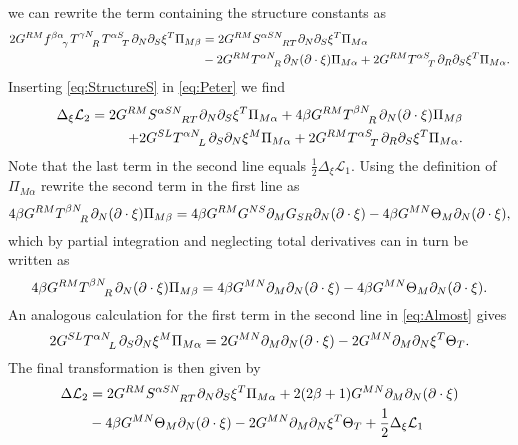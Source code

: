 we can rewrite the term containing the structure constants as 
\begin{equation}\label{eq:StructureS}
    \begin{aligned}
        2G^{RM}\tensor{f}{^{\beta\alpha}_\gamma}\tensor{T}{^{\gamma N}_R}\tensor{T}{^{\alpha S}_T}\pd_N\pd_S\xi^T\Pi_{M\beta} &= 2G^{RM}\tensor{S}{^{\alpha SN}_{RT}}\pd_N\pd_S\xi^T\Pi_{M\alpha}\\
        &-2G^{RM}\tensor{T}{^{\alpha N}_R}\pd_N(\pd\cdot\xi)\Pi_{M\alpha}+2G^{RM}\tensor{T}{^{\alpha S}_T}\pd_R\pd_S\xi^T\Pi_{M\alpha}.
    \end{aligned}
\end{equation}
Inserting \eqref{eq:StructureS} in \eqref{eq:Peter} we find 
\begin{equation}\label{eq:Almost}
    \begin{aligned}
    \Delta_\xi \mathcal{L}_2 = 2G^{RM}\tensor{S}{^{\alpha SN}_{RT}}\pd_N\pd_S\xi^T\Pi_{M\alpha}+4\beta G^{RM}\tensor{T}{^{\beta N}_R}\pd_N(\pd\cdot\xi)\Pi_{M\beta}\\
    +2G^{SL}\tensor{T}{^{\alpha N}_L}\pd_S\pd_N\xi^M\Pi_{M\alpha}+2G^{RM}\tensor{T}{^{\alpha S}_T}\pd_R\pd_S\xi^T\Pi_{M\alpha}.
    \end{aligned}
\end{equation}
Note that the last term in the second line equals $\frac{1}{2}\Delta_\xi\mathcal{L}_1$. Using the definition of $\Pi_{M\alpha}$ rewrite the second term in the first line as 
\begin{equation}
    4\beta G^{RM}\tensor{T}{^{\beta N}_R}\pd_N(\pd\cdot \xi)\Pi_{M\beta} = 4\beta G^{RM}G^{NS}\pd_M G_{SR}\pd_N(\pd\cdot\xi)-4\beta G^{MN}\Theta_M\pd_N(\pd\cdot\xi),
\end{equation}
which by partial integration and neglecting total derivatives can in turn be written as 
\begin{equation}
    4\beta G^{RM}\tensor{T}{^{\beta N}_R}\pd_N(\pd\cdot \xi)\Pi_{M\beta} = 4\beta G^{MN}\pd_M\pd_N(\pd\cdot\xi)-4\beta G^{MN}\Theta_M\pd_N(\pd\cdot\xi).
\end{equation}
An analogous calculation for the first term in the second line in \eqref{eq:Almost} gives 
\begin{equation}
    2G^{SL}\tensor{T}{^{\alpha N}_L}\pd_S\pd_N\xi^M\Pi_{M\alpha} = 2G^{MN}\pd_M\pd_N(\pd\cdot\xi)-2G^{MN}\pd_M\pd_N\xi^T\Theta_T.
\end{equation}
The final transformation is then given by
\begin{equation}
    \begin{aligned}
    \Delta \mathcal{L}_2 &= 2G^{RM}\tensor{S}{^{\alpha SN}_{RT}}\pd_N\pd_S\xi^T\Pi_{M\alpha}+2(2\beta+1)G^{MN}\pd_M\pd_N(\pd\cdot\xi)\\
    &-4\beta G^{MN}\Theta_M\pd_N(\pd\cdot\xi)-2G^{MN}\pd_M\pd_N\xi^T\Theta_T+\frac{1}{2}\Delta_\xi \mathcal{L}_1
    \end{aligned}
\end{equation}
